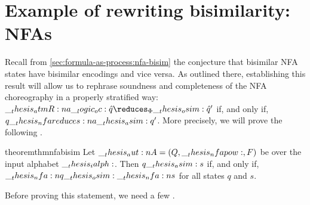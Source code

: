 \section{Example of rewriting bisimilarity: \Aclp*{NFA}}\label{sec:ordered-bisimilarity:nfa}

Recall from \cref{sec:formula-as-process:nfa-bisim} the conjecture that bisimilar \ac{NFA} states have bisimilar encodings and vice versa.
As outlined there, establishing this result will allow us to rephrase soundness and completeness of the \ac{NFA} choreography in a properly stratified way: $\atmR{a} \oc \defp{q} \reduces_{\orsig}\osim \defp{q}'$ if, and only if, $q \nfareduces[a]\asim q'$.
More precisely, we will prove the following .
\begin{restatable*}[
  label=thm:nfa-bisim-osim
]{theorem}{thmnfabisim}
  Let $\__thesis_aut:n {A} = (Q, \__thesis_nfapow:, F)$ be  over the input alphabet $\__thesis_ialph:$.
  Then $q \__thesis_asim: s$ if, and only if, $\__thesis_nfa:n {q} \__thesis_osim: \__thesis_nfa:n {s}$ for all states $q$ and $s$.
\end{restatable*}
\noindent
Before proving this statement, we need a few .
%

%

